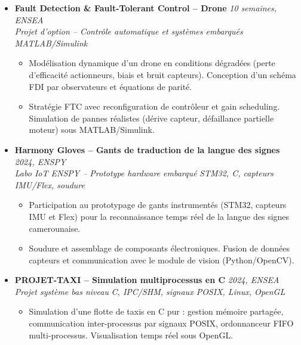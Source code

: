\documentclass[a4paper,11pt]{article}
\begin{document}
\begin{itemize}[leftmargin=*, label={-}]
\item \textbf{Fault Detection \& Fault-Tolerant Control -- Drone} \hfill \textit{10 semaines, ENSEA} \\
\textit{Projet d'option -- Contrôle automatique et systèmes embarqués} \hfill \textit{MATLAB/Simulink}
\vspace{-2pt}
\begin{itemize}[leftmargin=0.4cm, nosep, label=\tiny$\bullet$]
    \item \small{Modélisation dynamique d'un drone en conditions dégradées (perte d'efficacité actionneurs, biais et bruit capteurs). Conception d'un schéma FDI par observateurs et équations de parité.}
    \item \small{Stratégie FTC avec reconfiguration de contrôleur et gain scheduling. Simulation de pannes réalistes (dérive capteur, défaillance partielle moteur) sous MATLAB/Simulink.}
\end{itemize}
\vspace{3pt}

\item \textbf{Harmony Gloves -- Gants de traduction de la langue des signes} \hfill \textit{2024, ENSPY} \\
\textit{Labo IoT ENSPY -- Prototype hardware embarqué} \hfill \textit{STM32, C, capteurs IMU/Flex, soudure}
\vspace{-2pt}
\begin{itemize}[leftmargin=0.4cm, nosep, label=\tiny$\bullet$]
    \item \small{Participation au prototypage de gants instrumentés (STM32, capteurs IMU et Flex) pour la reconnaissance temps réel de la langue des signes camerounaise.}
    \item \small{Soudure et assemblage de composants électroniques. Fusion de données capteurs et communication avec le module de vision (Python/OpenCV).}
\end{itemize}
\vspace{3pt}

\item \textbf{PROJET-TAXI -- Simulation multiprocessus en C} \hfill \textit{2024, ENSEA} \\
\textit{Projet système bas niveau} \hfill \textit{C, IPC/SHM, signaux POSIX, Linux, OpenGL}
\vspace{-2pt}
\begin{itemize}[leftmargin=0.4cm, nosep, label=\tiny$\bullet$]
    \item \small{Simulation d'une flotte de taxis en C pur : gestion mémoire partagée, communication inter-processus par signaux POSIX, ordonnanceur FIFO multi-processus. Visualisation temps réel sous OpenGL.}
\end{itemize}
\vspace{3pt}

\end{itemize}
\end{document}
